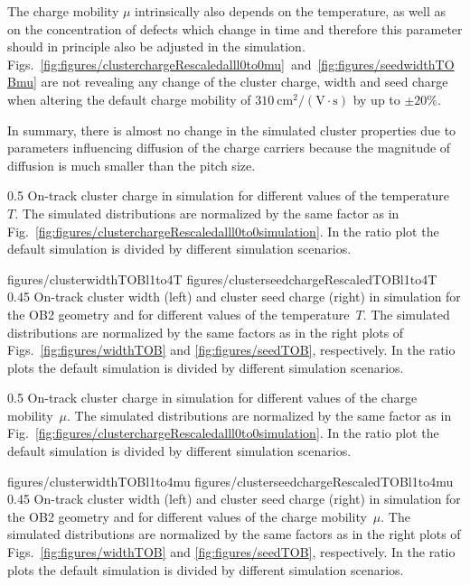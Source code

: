 The charge mobility $\mu$ intrinsically also depends on the temperature, as well as on the concentration of defects which change in time and therefore this parameter should in principle also be adjusted in the simulation. Figs.~\ref{fig:figures/clusterchargeRescaledalll0to0mu}~and~\ref{fig:figures/seedwidthTOBmu} are not revealing any change of the cluster charge, width and seed charge when altering the default charge mobility of $310~\mathrm{cm^2/(V \cdot s)}$ by up to $\pm 20\%$. 

In summary, there is almost no change in the simulated cluster properties due to parameters influencing diffusion of the charge carriers because the magnitude of diffusion is much smaller than the pitch size.


                 {0.5}       %
                 { On-track cluster charge in simulation for different values of the temperature~$T$.   The simulated distributions are normalized by the same factor as in Fig.~\ref{fig:figures/clusterchargeRescaledalll0to0simulation}.  In the ratio plot the default simulation is divided by different simulation scenarios. }

                 {figures/clusterwidthTOBl1to4T}
                 {figures/clusterseedchargeRescaledTOBl1to4T} %
                 {0.45}       %
                 {  On-track cluster width (left) and cluster seed charge (right) in simulation  for the OB2 geometry and for different values of the temperature~$T$.  The simulated distributions are normalized by the same factors as in the right plots of Figs.~\ref{fig:figures/widthTOB} and \ref{fig:figures/seedTOB}, respectively.   In the ratio plots the default simulation is divided by different simulation scenarios. }

                 {0.5}       %
                 { On-track cluster charge in simulation for different values of the charge mobility~$\mu$.   The simulated distributions are normalized by the same factor as in Fig.~\ref{fig:figures/clusterchargeRescaledalll0to0simulation}.  In the ratio plot the default simulation is divided by different simulation scenarios. }

                 {figures/clusterwidthTOBl1to4mu}
                 {figures/clusterseedchargeRescaledTOBl1to4mu} %
                 {0.45}       %
                 { On-track cluster width (left) and cluster seed charge (right) in simulation  for the OB2 geometry and for different values of the charge mobility~$\mu$.  The simulated distributions are normalized by the same factors as in the right plots of Figs.~\ref{fig:figures/widthTOB} and \ref{fig:figures/seedTOB}, respectively.   In the ratio plots the default simulation is divided by different simulation scenarios. }

